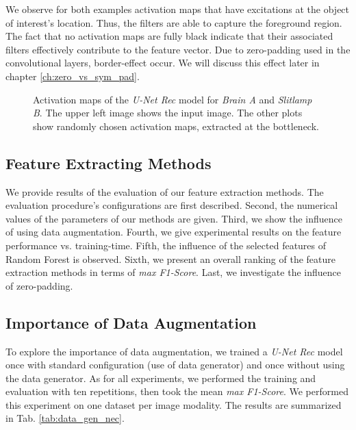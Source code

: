 We observe for both examples activation maps that have excitations at the object of interest's location. Thus, the filters are able to capture the foreground region. The fact that no activation maps are fully black indicate that their associated filters effectively contribute to the feature vector. Due to zero-padding used in the convolutional layers, border-effect occur. We will discuss this effect later in chapter \ref{ch:zero_vs_sym_pad}.
\vspace{30pt}

\begin{figure}[!htbp]
  \centering
  \hfill
  \caption[Activation maps]{Activation maps of the \textit{U-Net Rec} model for \textit{Brain A} and \textit{Slitlamp B}.
    The upper left image shows the input image.
    The other plots show randomly chosen activation maps, extracted at the bottleneck.}
  \label{fig:activatiom_maps}
\end{figure}

\clearpage
\subsection{Feature Extracting Methods}
We provide results of the evaluation of our feature extraction methods.
The evaluation procedure's configurations are first described.
Second, the numerical values of the parameters of our methods are given.
Third, we show the influence of using data augmentation.
Fourth, we give experimental results on the feature performance vs. training-time.
Fifth, the influence of the selected features of Random Forest is observed.
Sixth, we present an overall ranking of the feature extraction methods in terms of \textit{max F1-Score}.
Last, we investigate the influence of zero-padding.


\subsection{Importance of Data Augmentation} \label{ch:nec_data_gen}
To explore the importance of data augmentation, we trained a \textit{U-Net Rec} model once with standard configuration (use of data generator) and once without using the data generator.
As for all experiments, we performed the training and evaluation with ten repetitions, then took the mean \textit{max F1-Score}.
We performed this experiment on one dataset per image modality. The results are summarized in Tab. \ref{tab:data_gen_nec}.
\vspace{30pt}

